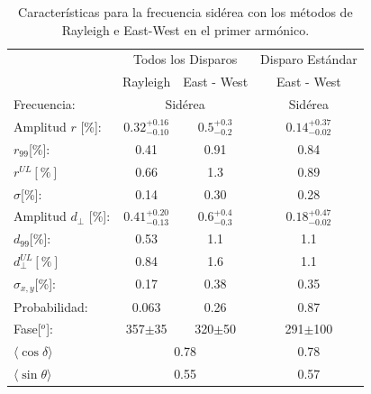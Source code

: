     \begin{table}[H]
        \begin{small}
            \begin{center}
                \begin{tabular}[c]{l|c|c||c|}
                    \cline{2-4}               &  \multicolumn{2}{c||}{Todos los Disparos}                  & Disparo Estándar      \\
                    \cline{2-4}               & Rayleigh                      & East - West                 & East - West\cite{Aab_2020}      \\\hline
\multicolumn{1}{|l|}{Frecuencia:             }& \multicolumn{2}{c||}{Sidérea}                               & Sidérea        \\ \hline
\multicolumn{1}{|l|}{Amplitud $r$ [\%]:      }& $0.32^{+0.16}_{-0.10}$ 	      & $0.5^{+0.3}_{-0.2}$         & $0.14^{+0.37}_{-0.02}$\cite{codigo}       \\
\multicolumn{1}{|l|}{$r_{99}$[\%]:           }& 0.41	                      & 0.91                        & 0.84\cite{codigo}        \\
\multicolumn{1}{|l|}{$r^{UL}[\%]$      }      & 0.66                          & 1.3                         & 0.89 \cite{codigo}        \\
\multicolumn{1}{|l|}{$\sigma$[\%]:     }      & 0.14                          & 0.30	                    & 0.28 \cite{codigo}          \\ \hline
\multicolumn{1}{|l|}{Amplitud $d_\perp$ [\%]:}& $0.41^{+0.20}_{-0.13}$        & $0.6^{+0.4}_{-0.3}$         & $0.18^{+0.47}_{-0.02}$       \\ 
\multicolumn{1}{|l|}{$d_{99}$[\%]:           }& 0.53	                      & 1.1                         & 1.1\cite{codigo}        \\
\multicolumn{1}{|l|}{$d_{\perp}^{UL}[\%]$    }& 0.84                          & 1.6                         & 1.1        \\
\multicolumn{1}{|l|}{$\sigma_{x,y}$[\%]:     }& 0.17                          & 0.38	                    & 0.35          \\ \hline
\multicolumn{1}{|l|}{Probabilidad:           }& 0.063	                      & 0.26                        & 0.87          \\
\multicolumn{1}{|l|}{Fase[$^o$]:             }& 357$\pm$35                    & 320$\pm$50                 & 291$\pm$100      \\\hline
\multicolumn{1}{|l|}{$\langle\cos\delta\rangle$} & \multicolumn{2}{c||}{0.78}                              & 0.78       \\        
\multicolumn{1}{|l|}{$\langle\sin\theta\rangle$} & \multicolumn{2}{c||}{0.55}                              & 0.57       \\ \hline       
\end{tabular}
            \end{center}
        \end{small}
        \caption{Características para la frecuencia sidérea con los métodos de Rayleigh  e East-West en el primer armónico.}
        \label{tab:siderea_3}
    \end{table}
   
